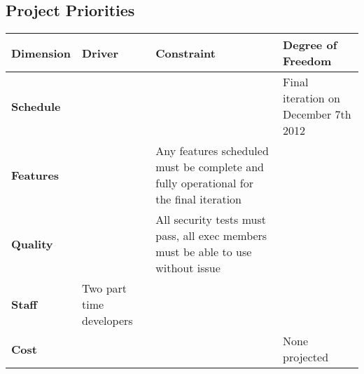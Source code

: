 \documentclass[11pt,letterpaper,rotate]{article}
\begin{document}
\subsection{Project Priorities}

\FloatBarrier

\begin{flushleft}
\begin{longtable}{@{}|p{2.7cm}|p{3.7cm}|p{3.7cm}|p{3.7cm}|}
        \hline
        {\bf Dimension} & {\bf Driver}                   & {\bf
          Constraint}
        & {\bf Degree of Freedom}                    \\ \hline
        {\bf Schedule}  & ~                        & ~                                                                                     & Final iteration on December 7th 2012 \\ \hline
        {\bf Features}  & ~                        & Any features scheduled must be complete and fully operational for the final iteration & ~                                    \\ \hline
        {\bf Quality}   & ~                        & All security tests must pass, all exec members must be able to use without issue      & ~                                    \\ \hline
        {\bf Staff}     & Two part time developers & ~                                                                                     & ~                                    \\ \hline
        {\bf Cost}      & ~                        & ~                                                                                     & None projected                       \\
        \hline
\end{longtable}
\end{flushleft}
\FloatBarrier
\end{document}
